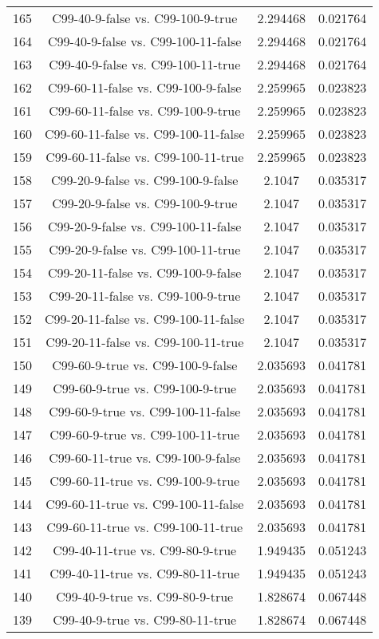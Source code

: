 \documentclass[a4paper,10pt]{article}
\begin{document}
\begin{landscape}
\begin{table}[!htp]
\begin{tabular}{cccc}
165&C99-40-9-false vs. C99-100-9-true&2.294468&0.021764\\
164&C99-40-9-false vs. C99-100-11-false&2.294468&0.021764\\
163&C99-40-9-false vs. C99-100-11-true&2.294468&0.021764\\
162&C99-60-11-false vs. C99-100-9-false&2.259965&0.023823\\
161&C99-60-11-false vs. C99-100-9-true&2.259965&0.023823\\
160&C99-60-11-false vs. C99-100-11-false&2.259965&0.023823\\
159&C99-60-11-false vs. C99-100-11-true&2.259965&0.023823\\
158&C99-20-9-false vs. C99-100-9-false&2.1047&0.035317\\
157&C99-20-9-false vs. C99-100-9-true&2.1047&0.035317\\
156&C99-20-9-false vs. C99-100-11-false&2.1047&0.035317\\
155&C99-20-9-false vs. C99-100-11-true&2.1047&0.035317\\
154&C99-20-11-false vs. C99-100-9-false&2.1047&0.035317\\
153&C99-20-11-false vs. C99-100-9-true&2.1047&0.035317\\
152&C99-20-11-false vs. C99-100-11-false&2.1047&0.035317\\
151&C99-20-11-false vs. C99-100-11-true&2.1047&0.035317\\
150&C99-60-9-true vs. C99-100-9-false&2.035693&0.041781\\
149&C99-60-9-true vs. C99-100-9-true&2.035693&0.041781\\
148&C99-60-9-true vs. C99-100-11-false&2.035693&0.041781\\
147&C99-60-9-true vs. C99-100-11-true&2.035693&0.041781\\
146&C99-60-11-true vs. C99-100-9-false&2.035693&0.041781\\
145&C99-60-11-true vs. C99-100-9-true&2.035693&0.041781\\
144&C99-60-11-true vs. C99-100-11-false&2.035693&0.041781\\
143&C99-60-11-true vs. C99-100-11-true&2.035693&0.041781\\
142&C99-40-11-true vs. C99-80-9-true&1.949435&0.051243\\
141&C99-40-11-true vs. C99-80-11-true&1.949435&0.051243\\
140&C99-40-9-true vs. C99-80-9-true&1.828674&0.067448\\
139&C99-40-9-true vs. C99-80-11-true&1.828674&0.067448\\

\end{tabular}
\end{table}
\end{landscape}
\end{document}
